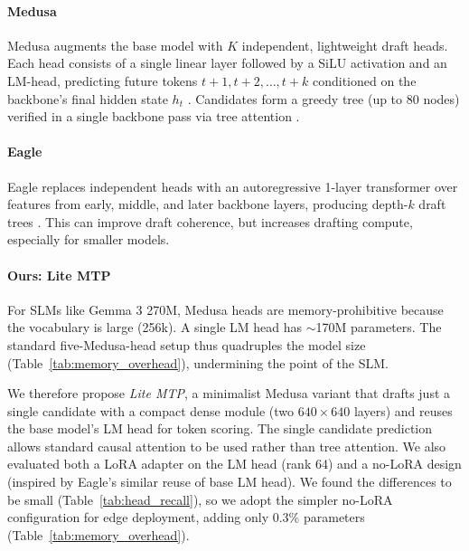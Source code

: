 \documentclass{article} %
\begin{document}
\paragraph{Medusa}
Medusa augments the base model with $K$ independent, lightweight draft heads. Each head consists of a single linear layer followed by a SiLU activation and an LM-head, predicting future tokens $t+1, t+2, \ldots, t+k$ conditioned on the backbone's final hidden state $h_t$ \citep{leviathan2023fast}. Candidates form a greedy tree (up to 80 nodes) verified in a single backbone pass via tree attention \citep{cai2024medusa, miao2024specinfer}.


\paragraph{Eagle}
Eagle replaces independent heads with an autoregressive 1-layer transformer over features from early, middle, and later backbone layers, producing depth-$k$ draft trees \citep{li2024eagle}. This can improve draft coherence, but increases drafting compute, especially for smaller models.

\paragraph{Ours: Lite MTP}
For SLMs like Gemma 3 270M, Medusa heads are memory-prohibitive because the vocabulary is large (256k). A single LM head has $\sim$170M parameters. The standard five-Medusa-head setup thus quadruples the model size (Table~\ref{tab:memory_overhead}), undermining the point of the SLM.

We therefore propose \textit{Lite MTP}, a minimalist Medusa variant that drafts just a single candidate with a compact dense module (two $640\times 640$ layers) and reuses the base model's LM head for token scoring. The single candidate prediction allows standard causal attention to be used rather than tree attention. We also evaluated both a LoRA adapter on the LM head (rank 64) \citep{hu2021lora} and a no-LoRA design (inspired by Eagle's similar reuse of base LM head). We found the differences to be small (Table~\ref{tab:head_recall}), so we adopt the simpler no-LoRA configuration for edge deployment, adding only 0.3\% parameters (Table~\ref{tab:memory_overhead}).
\end{document}
